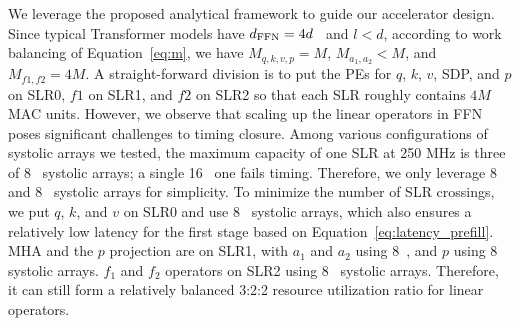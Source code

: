 We leverage the proposed analytical framework to guide our accelerator design.
Since typical Transformer models have $d_{\text{FFN}}=4d$~\cite{devlin2018bert,radford2019gpt2} and $l<d$, according to work balancing of Equation~\eqref{eq:m}, we have $M_{q,k,v,p} = M$, $M_{a_1, a_2} < M$, and $M_{f1, f2} = 4M$.
A straight-forward division is to put the PEs for $q$, $k$, $v$, SDP, and $p$ on SLR0, $f1$ on SLR1, and $f2$ on SLR2 so that each SLR roughly contains $4M$ MAC units.
However, we observe that scaling up the linear operators in FFN poses significant challenges to timing closure. 
Among various configurations of systolic arrays we tested, the maximum capacity of one SLR at 250 MHz is three of 8~ systolic arrays; a single 16~ one fails timing. 
Therefore, we only leverage 8~ and 8~ systolic arrays for simplicity. 
To minimize the number of SLR crossings, we put $q$, $k$, and $v$ on SLR0 and use 8~ systolic arrays, which also ensures a relatively low latency for the first stage based on Equation~\eqref{eq:latency_prefill}.
MHA and the $p$ projection are on SLR1, with $a_1$ and $a_2$ using 8~, and $p$ using 8~ systolic arrays.
$f_1$ and $f_2$ operators on SLR2 using 8~ systolic arrays.
Therefore, it can still form a relatively balanced 3:2:2 resource utilization ratio for linear operators.



